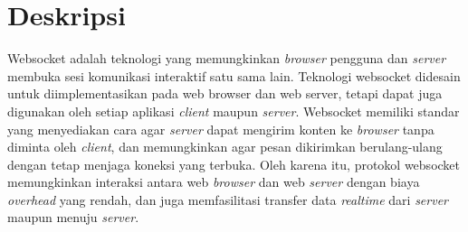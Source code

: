 \documentclass[a4paper,twoside]{article}
\begin{document}
\title{\@judultopik}
\author{\nama \textendash \@npm} 

\newcommand{\nama}{Priambodo Pangestu}
\newcommand{\@npm}{2013730055}
\newcommand{\@judultopik}{Pemanfaatan Smartphone Sebagai Pengendali Permainan Berbasis Web} %
\newcommand{\jumpemb}{1} %
\newcommand{\tanggal}{01/01/1900}
\maketitle


\section{Deskripsi}





Websocket adalah teknologi yang memungkinkan \textit{browser} pengguna dan \textit{server} membuka sesi komunikasi interaktif satu sama lain. Teknologi websocket didesain untuk diimplementasikan pada web browser dan web server, tetapi dapat juga digunakan oleh setiap aplikasi \textit{client} maupun \textit{server}. Websocket memiliki standar yang menyediakan cara agar \textit{server} dapat mengirim konten ke \textit{browser} tanpa diminta oleh \textit{client}, dan memungkinkan agar pesan dikirimkan berulang-ulang dengan tetap menjaga koneksi yang terbuka. Oleh karena itu, protokol websocket memungkinkan interaksi antara web \textit{browser} dan web \textit{server} dengan biaya \textit{overhead} yang rendah, dan juga memfasilitasi transfer data \textit{realtime} dari \textit{server} maupun menuju \textit{server}.
\end{document}
